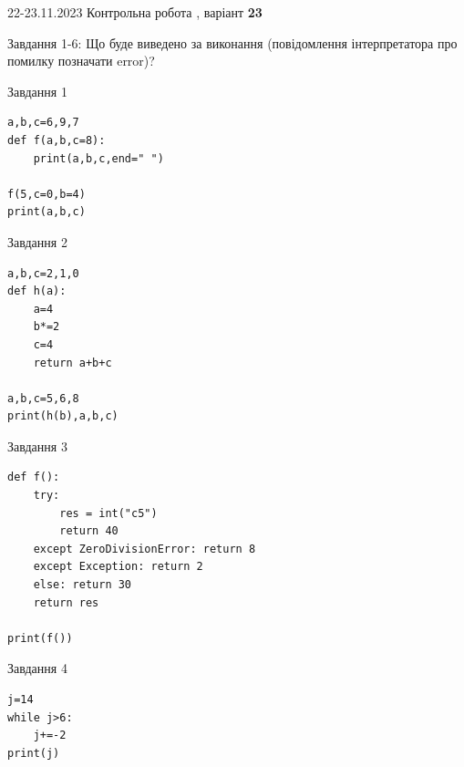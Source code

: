 \documentclass[12pt, ukrainian]{article}
\begin{document}
{{22-23.11.2023 Контрольна робота , варіант  \No \textbf { 23 }\par}}
{

Завдання 1-6: Що буде виведено за виконання (повідомлення інтерпретатора про помилку позначати error)?


\begin{minipage}[t]{9.7cm}                
{\begin{center}Завдання {1}\end{center}}
\begin{verbatim}
a,b,c=6,9,7
def f(a,b,c=8):
    print(a,b,c,end=" ")

f(5,c=0,b=4)
print(a,b,c)
\end{verbatim}     
\end{minipage}
\vline \hspace{8mm}
\begin{minipage}[t]{8.0cm}                
{\begin{center}Завдання {2}\end{center}}
\begin{verbatim}
a,b,c=2,1,0
def h(a):
    a=4
    b*=2
    c=4
    return a+b+c

a,b,c=5,6,8
print(h(b),a,b,c)
\end{verbatim}     
\end{minipage}

\vspace{15mm}
\begin{minipage}[t]{9.7cm}                
{\begin{center}Завдання {3}\end{center}}
\begin{verbatim}
def f():
    try:
        res = int("c5")
        return 40
    except ZeroDivisionError: return 8
    except Exception: return 2
    else: return 30
    return res

print(f())
\end{verbatim}     
\end{minipage}
\vline \hspace{8mm}
\begin{minipage}[t]{8.0cm}                
{\begin{center}Завдання {4}\end{center}}
\begin{verbatim}
j=14
while j>6:
    j+=-2
print(j)
\end{verbatim}     
\end{minipage}

}
\end{document}
